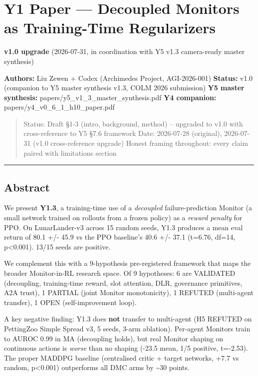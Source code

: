 \documentclass[
]{article}
\author{}
\date{}
\begin{document}
\section{Y1 Paper --- Decoupled Monitors as Training-Time
Regularizers}\label{y1-paper-decoupled-monitors-as-training-time-regularizers}

\textbf{v1.0 upgrade} (2026-07-31, in coordination with Y5 v1.3
camera-ready master synthesis)

\textbf{Authors:} Liu Zewen + Codex (Archimedes Project, AGI-2026-001)
\textbf{Status:} v1.0 (companion to Y5 master synthesis v1.3, COLM 2026
submission) \textbf{Y5 master synthesis:}
papers/y5\_v1\_3\_master\_synthesis.pdf \textbf{Y4 companion:}
papers/y4\_v0\_6\_1\_h10\_paper.pdf

\begin{quote}
Status: Draft §1-3 (intro, background, method) -- upgraded to v1.0 with
cross-reference to Y5 §7.6 framework Date: 2026-07-28 (original),
2026-07-31 (v1.0 cross-reference upgrade) Honest framing throughout:
every claim paired with limitations section
\end{quote}

\begin{center}\rule{0.5\linewidth}{0.5pt}\end{center}

\subsection{Abstract}\label{abstract}

We present \textbf{Y1.3}, a training-time use of a \emph{decoupled}
failure-prediction Monitor (a small network trained on rollouts from a
frozen policy) as a \emph{reward penalty} for PPO. On LunarLander-v3
across 15 random seeds, Y1.3 produces a mean eval return of 80.1 +/-
45.9 vs the PPO baseline's 40.6 +/- 37.1 (t=6.76, df=14,
p\textless0.001). 13/15 seeds are positive.

We complement this with a 9-hypothesis pre-registered framework that
maps the broader Monitor-in-RL research space. Of 9 hypotheses: 6 are
VALIDATED (decoupling, training-time reward, slot attention, DLR,
governance primitives, A2A trust), 1 PARTIAL (joint Monitor
monotonicity), 1 REFUTED (multi-agent transfer), 1 OPEN
(self-improvement loop).

A key negative finding: Y1.3 does \textbf{not} transfer to multi-agent
(H5 REFUTED on PettingZoo Simple Spread v3, 5 seeds, 3-arm ablation).
Per-agent Monitors train to AUROC 0.99 in MA (decoupling holds), but
real Monitor shaping on continuous actions is \emph{worse} than no
shaping (-23.5 mean, 1/5 positive, t=-2.53). The proper MADDPG baseline
(centralised critic + target networks, +7.7 vs random, p\textless0.001)
outperforms all DMC arms by \textasciitilde30 points.
\end{document}

